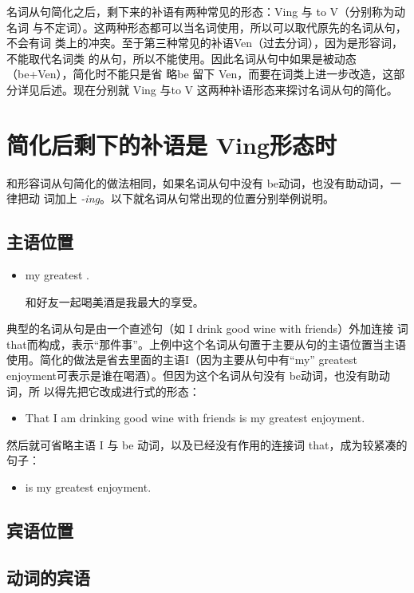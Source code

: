 名词从句简化之后，剩下来的补语有两种常见的形态：Ving 与 to V（分别称为动名词
与不定词）。这两种形态都可以当名词使用，所以可以取代原先的名词从句，不会有词
类上的冲突。至于第三种常见的补语Ven（过去分词），因为是形容词，不能取代名词类
的从句，所以不能使用。因此名词从句中如果是被动态（be+Ven），简化时不能只是省
略be 留下 Ven，而要在词类上进一步改造，这部分详见后述。现在分别就 Ving 与to
V 这两种补语形态来探讨名词从句的简化。

\section{简化后剩下的补语是 Ving形态时}

和形容词从句简化的做法相同，如果名词从句中没有 be动词，也没有助动词，一律把动
词加上 \emph{-ing}。以下就名词从句常出现的位置分别举例说明。

\subsection{主语位置}

\begin{itemize}
\item {}  my greatest .

  和好友一起喝美酒是我最大的享受。
\end{itemize}
典型的名词从句是由一个直述句（如 I drink good wine with friends）外加连接
词 that而构成，表示“那件事”。上例中这个名词从句置于主要从句的主语位置当主语
使用。简化的做法是省去里面的主语I（因为主要从句中有“my” greatest
enjoyment可表示是谁在喝酒）。但因为这个名词从句没有 be动词，也没有助动词，所
以得先把它改成进行式的形态：
\begin{itemize}
\item That I am drinking good wine with friends is my greatest enjoyment.
\end{itemize}
然后就可省略主语 I 与 be 动词，以及已经没有作用的连接词
that，成为较紧凑的句子：
\begin{itemize}
\item {} is my greatest enjoyment.
\end{itemize}

\subsection{宾语位置}

\subsection{动词的宾语}

